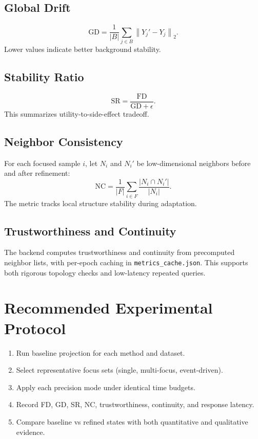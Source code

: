 \documentclass[12pt,a4paper]{report}
\begin{document}
\subsection{Global Drift}
\begin{equation}
\mathrm{GD} = \frac{1}{|B|}\sum_{j\in B}\left\|Y_j' - Y_j\right\|_2.
\end{equation}
Lower values indicate better background stability.

\subsection{Stability Ratio}
\begin{equation}
\mathrm{SR} = \frac{\mathrm{FD}}{\mathrm{GD}+\epsilon}.
\end{equation}
This summarizes utility-to-side-effect tradeoff.

\subsection{Neighbor Consistency}
For each focused sample \(i\), let \(N_i\) and \(N_i'\) be low-dimensional neighbors before and after refinement:
\begin{equation}
\mathrm{NC} = \frac{1}{|F|}\sum_{i\in F}\frac{|N_i \cap N_i'|}{|N_i|}.
\end{equation}
The metric tracks local structure stability during adaptation.

\subsection{Trustworthiness and Continuity}
The backend computes trustworthiness and continuity from precomputed neighbor lists, with per-epoch caching in \texttt{metrics\_cache.json}. This supports both rigorous topology checks and low-latency repeated queries.

\section{Recommended Experimental Protocol}
\begin{enumerate}
\item Run baseline projection for each method and dataset.
\item Select representative focus sets (single, multi-focus, event-driven).
\item Apply each precision mode under identical time budgets.
\item Record FD, GD, SR, NC, trustworthiness, continuity, and response latency.
\item Compare baseline vs refined states with both quantitative and qualitative evidence.
\end{enumerate}
\end{document}

